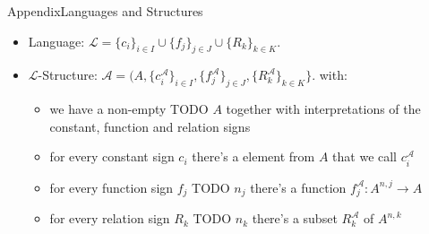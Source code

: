 \begin{frame}{Appendix}{Languages and Structures}
  \begin{itemize}
    \item \alert{Language:} ${\mathcal{L}}=\{c_{i}\}_{i\in I}\cup\{f_{j}\}_{j\in J}\cup\{R_{k}\}_{k\in K}.$
    \item \alert{$\mathcal{L}$-Structure:} $\mathcal{A}=(A,\{c_{i}^{\mathcal{A}}\}_{i\in I},\{f_{j}^{\mathcal{A}}\}_{j\in J},\{R_{k}^{\mathcal{A}}\}_{k\in K}\}.$ with:
    \begin{itemize}
      \item we have a non-empty TODO $A$ together with interpretations of the \alert{constant}, \alert{function} and \alert{relation} signs
      \item for every \alert{constant sign} $c_i$ there's a element from $A$ that we call $c_i^{\mathcal{A}}$
      \item for every \alert{function sign} $f_j$ TODO $n_j$ there's a function $f_j^{\mathcal{A}}: A^{n, j} \rightarrow A$
      \item for every \alert{relation sign} $R_k$ TODO $n_k$ there's a subset $R_k^{\mathcal{A}}$ of $A^{n, k}$
    \end{itemize}
  \end{itemize}
\end{frame}
